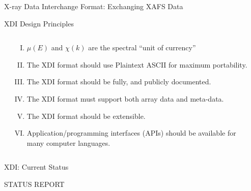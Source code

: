 \documentclass[final]{beamer}
\begin{document}
\begin{frame}{}
\begin{columns}[t]
\begin{column}{.55\linewidth}
\begin{block}{\large  X-ray Data Interchange Format:  Exchanging
            XAFS Data}
          \begin{block}{\large XDI Design Principles}

           \begin{columns}[T]
             \begin{column}{0.05\linewidth}    \end{column}
             \begin{column}{0.90\linewidth}

            \begin{enumerate}[I.] \normalsize
            \item $\mu(E)$ and $\chi(k)$ are the spectral ``unit of  currency''
            \item The XDI format should use Plaintext ASCII for maximum portability.
            \item The XDI format should be fully, and publicly documented.
            \item The XDI format must support both array data and meta-data.
            \item The XDI format should be extensible.
            \item Application/programming interfaces (APIs) should be
              available for many computer languages.
            \end{enumerate}

             \end{column}
             \begin{column}{0.05\linewidth}    \end{column}
             \end{columns}          \end{block}
        \end{block}

        \vspace{2mm}

      \begin{block}{\large XDI: Current Status}

        STATUS REPORT

      \end{block}
      \end{column}


\end{columns}
\end{frame}
\end{document}
